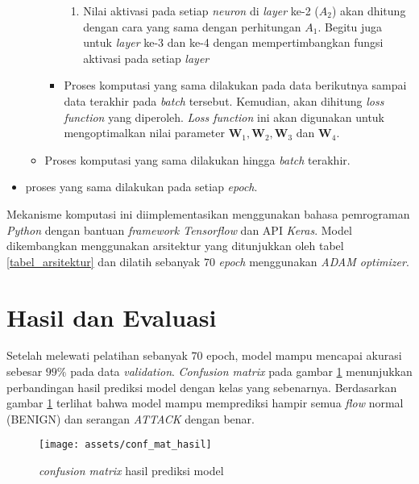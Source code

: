 \documentclass[a4paper,12pt]{report}
\begin{document}
\begin{itemize}
\begin{itemize}
\begin{itemize}
\begin{enumerate}
				\item Nilai aktivasi pada setiap \textit{neuron} di \textit{layer} ke-2 ($A_2$) akan dhitung dengan cara yang sama dengan perhitungan $A_1$. Begitu juga untuk \textit{layer} ke-3 dan ke-4 dengan mempertimbangkan fungsi aktivasi pada setiap \textit{layer}
				
			\end{enumerate} 
				
			\item Proses komputasi yang sama dilakukan pada data berikutnya sampai data terakhir pada \textit{batch} tersebut. Kemudian, akan dihitung \textit{loss function} yang diperoleh. \textit{Loss function} ini akan digunakan untuk mengoptimalkan nilai parameter $\mathbf{W}_{1}, \mathbf{W}_{2}, \mathbf{W}_{3}$ dan $\mathbf{W}_{4}$.
		\end{itemize}
		\item Proses komputasi yang sama dilakukan hingga \textit{batch} terakhir.
	\end{itemize}
	\item proses yang sama dilakukan pada setiap \textit{epoch}.
\end{itemize}

Mekanisme komputasi ini diimplementasikan menggunakan bahasa pemrograman \textit{Python} dengan bantuan \textit{framework Tensorflow} dan API \textit{Keras}. Model dikembangkan menggunakan arsitektur yang ditunjukkan oleh tabel \ref{tabel_arsitektur} dan dilatih sebanyak $70$ \textit{epoch} menggunakan \textit{ADAM optimizer}.

\section{Hasil dan Evaluasi}
Setelah melewati pelatihan sebanyak $70$ epoch, model mampu mencapai akurasi sebesar $99\%$ pada data \textit{validation}. \textit{Confusion matrix} pada gambar \ref{conf_mat_hasil} menunjukkan perbandingan hasil prediksi model dengan kelas yang sebenarnya. Berdasarkan gambar \ref{conf_mat_hasil} terlihat bahwa model mampu memprediksi hampir semua \textit{flow} normal (BENIGN) dan serangan \textit{ATTACK} dengan benar. 

\begin{figure}[H]
	\center \texttt{[image: assets/conf\_mat\_hasil]}
	\caption{\textit{confusion matrix} hasil prediksi model} 
	\label{conf_mat_hasil}
\end{figure}
\end{document}
